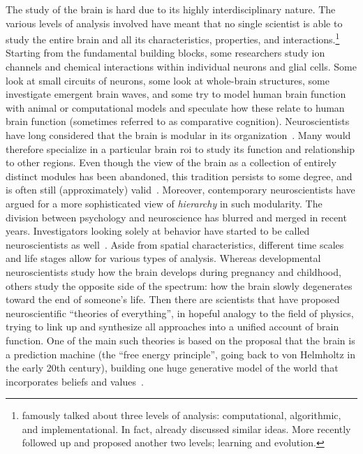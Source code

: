 The study of the brain is hard due to its highly interdisciplinary nature.
The various levels of analysis involved have meant that no single scientist is able to study the entire brain and all its characteristics, properties, and interactions.\footnote{\textcite{Marr1982} famously talked about three levels of analysis: computational, algorithmic, and implementational. In fact, \textcite{Marr1976} already discussed similar ideas. More recently \textcite{Poggio2012} followed up and proposed another two levels; learning and evolution.}
%
Starting from the fundamental building blocks, some researchers study ion channels and chemical interactions within individual neurons and glial cells.
Some look at small circuits of neurons, some look at whole-brain structures, some investigate emergent brain waves, and some try to model human brain function with animal or computational models and speculate how these relate to human brain function (sometimes referred to as comparative cognition).
Neuroscientists have long considered that the brain is modular in its organization~\parencite{Prinz2006}.
Many would therefore specialize in a particular brain \gls{roi} to study its function and relationship to other regions.
Even though the view of the brain as a collection of entirely distinct modules has been abandoned, this tradition persists to some degree, and is often still (approximately) valid~\parencite{Genon2018}.
Moreover, contemporary neuroscientists have argued for a more sophisticated view of \emph{hierarchy} in such modularity.
%
The division between psychology and neuroscience has blurred and merged in recent years.
Investigators looking solely at behavior have started to be called neuroscientists as well~\parencite{Niv2021}.
%
Aside from spatial characteristics, different time scales and life stages allow for various types of analysis.
Whereas developmental neuroscientists study how the brain develops during pregnancy and childhood, others study the opposite side of the spectrum: how the brain slowly degenerates toward the end of someone's life.
%
Then there are scientists that have proposed neuroscientific ``theories of everything'', in hopeful analogy to the field of physics, trying to link up and synthesize all approaches into a unified account of brain function.
One of the main such theories is based on the proposal that the brain is a prediction machine (the ``free energy principle'', going back to von Helmholtz in the early 20th century), building one huge generative model of the world that incorporates beliefs and values~\parencite{Friston2010, Gershman2019}.
